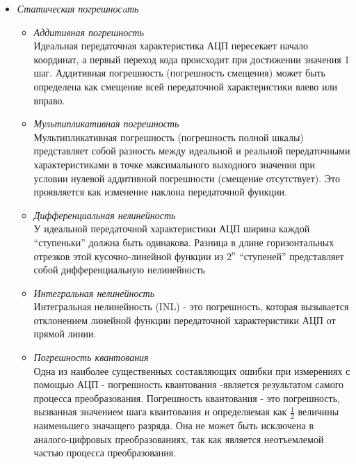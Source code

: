 \begin{itemize}
    \item \textit{Статическая погрешносaть}
        \begin{itemize}
            \item \textit{Аддитивная погрешность} \\
            Идеальная передаточная характеристика АЦП пересекает начало координат, а первый
            переход кода происходит при достижении значения 1 шаг. Аддитивная погрешность
            (погрешность смещения) может быть определена как смещение всей передаточной
            характеристики влево или вправо.
            \item \textit{Мультипликативная погрешность} \\
            Мультипликативная погрешность (погрешность полной шкалы) представляет собой разность
            между идеальной и реальной передаточными характеристиками в точке максимального
            выходного значения при условии нулевой аддитивной погрешности (смещение отсутствует).
            Это проявляется как изменение наклона передаточной функции.
            \item \textit{Дифференциальная нелинейность} \\
            У идеальной передаточной характеристики АЦП ширина каждой ``ступеньки'' должна быть
            одинакова. Разница в длине горизонтальных отрезков этой кусочно-линейной функции из
            $2^{n}$ ``ступеней'' представляет собой дифференциальную нелинейность
            \item \textit{Интегральная нелинейность} \\
            Интегральная нелинейность (INL) - это погрешность, которая вызывается отклонением
            линейной функции передаточной характеристики АЦП от прямой линии.
            \item \textit{Погрешность квантования} \\
            Одна из наиболее существенных составляющих ошибки при измерениях с помощью АЦП -
            погрешность квантования -является результатом самого процесса преобразования.
            Погрешность квантования - это погрешность, вызванная значением шага квантования
            и определяемая как $\frac{1}{2}$ величины наименьшего значащего разряда.
            Она не может быть исключена в аналого-цифровых преобразованиях, так как является
            неотъемлемой частью процесса преобразования.
        \end{itemize}


\end{itemize}
